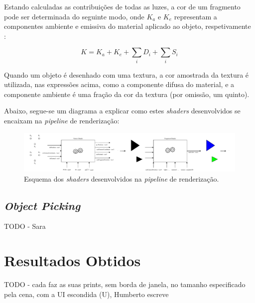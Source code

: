 \documentclass[12pt, a4paper]{article}
\begin{document}
Estando calculadas as contribuições de todas as luzes, a cor de um fragmento pode ser determinada do
seguinte modo, onde $K_a$ e $K_e$ representam a componentes ambiente e emissiva do material aplicado
ao objeto, respetivamente \cite{learn-opengl-1} \cite{learn-opengl-3}:

$$
K = K_a + K_e + \sum_{i} D_i + \sum_{i} S_i
$$

Quando um objeto é desenhado com uma textura, a cor amostrada da textura é utilizada, nas
expressões acima, como a componente difusa do material, e a componente ambiente é uma fração da cor
da textura (por omissão, um quinto).

Abaixo, segue-se um diagrama a explicar como estes \emph{shaders} desenvolvidos se encaixam na
\emph{pipeline} de renderização:

\begin{figure}[H]
    \centering
    \includegraphics[width=\textwidth]{res/phase4/Shaders.pdf}
    \caption{Esquema dos \emph{shaders} desenvolvidos na \emph{pipeline} de renderização.}
\end{figure}

\subsection{\emph{Object Picking}}

{\color{red} TODO - Sara}

\section{Resultados Obtidos}

{\color{red} TODO - cada faz as suas prints, sem borda de janela, no tamanho especificado pela cena,
com a UI escondida (U), Humberto escreve}
\end{document}
